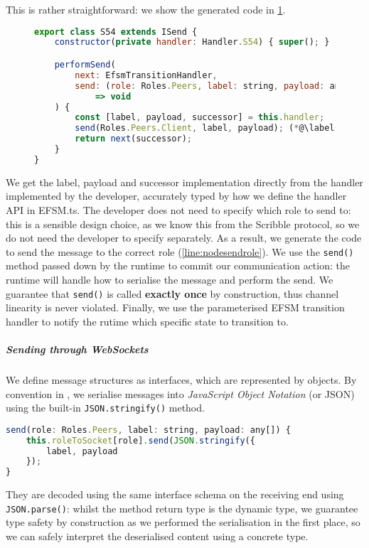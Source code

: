 This is rather straightforward: 
we show the generated code in \cref{lst:nodesend}.

\begin{figure}[!h]
\begin{lstlisting}[language=javascript,tabsize=2]
export class S54 extends ISend {
	constructor(private handler: Handler.S54) { super(); }

	performSend(
		next: EfsmTransitionHandler,
		send: (role: Roles.Peers, label: string, payload: any[]) 
			=> void
	) {
		const [label, payload, successor] = this.handler;
		send(Roles.Peers.Client, label, payload); (*@\label{line:nodesendrole}@*)
		return next(successor);
	}
}
\end{lstlisting}
\label{lst:nodesend}
\end{figure}

We get the label, payload and successor implementation
directly from the handler implemented by the developer, 
accurately typed by how we define the handler API in EFSM.ts.
The developer does not need to specify which role
to send to: this is a sensible design choice, as we know this
from the Scribble protocol, so we do not need the developer 
to specify separately.
As a result, we generate the code to send the message
to the correct role (\cref{line:nodesendrole}).
We use the \texttt{send()} method passed down
by the runtime to commit our communication action:
the runtime will handle how to serialise the message and perform
the send. We guarantee that \texttt{send()} is called
\textbf{exactly once} by construction, thus channel linearity
is never violated.
Finally, we use the parameterised EFSM transition handler
to notify the rutime which specific state to transition to.

\subparagraph{Sending through WebSockets}
We define message structures as interfaces, which
are represented by objects. 
By convention in ,
we serialise messages into \textit{JavaScript Object Notation}
(or JSON) \cite{json} using the built-in \texttt{JSON.stringify()}
method.

\begin{lstlisting}[language=javascript]
send(role: Roles.Peers, label: string, payload: any[]) {
	this.roleToSocket[role].send(JSON.stringify({
		label, payload
	});
}
\end{lstlisting}

They are decoded using the same interface schema on the receiving end
using \texttt{JSON.parse()}: whilst the method return type is the
dynamic  type, 
we guarantee type safety by construction
as we performed the serialisation in the first place, so
we can safely interpret the deserialised content 
using a concrete type.

